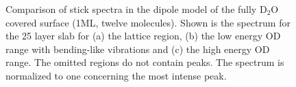 \documentclass[11pt,DIV=13,BCOR=5mm,a4paper,headinclude]{scrbook}
\begin{document}
 \begin{figure} [!h]
 \centering
              \quad
              \quad
 \caption{Comparison of stick spectra in the dipole model of the fully D$_2$O covered surface (1ML, twelve molecules).
Shown is the spectrum for the 25 layer slab for (a) the lattice region, (b) the low energy OD range with bending-like vibrations and (c) the high energy OD range.
The omitted regions do not contain peaks.
The spectrum is normalized to one concerning the most intense peak.} 
        \label{abb:fullyhydrox_spec}
\end{figure}
\end{document}
